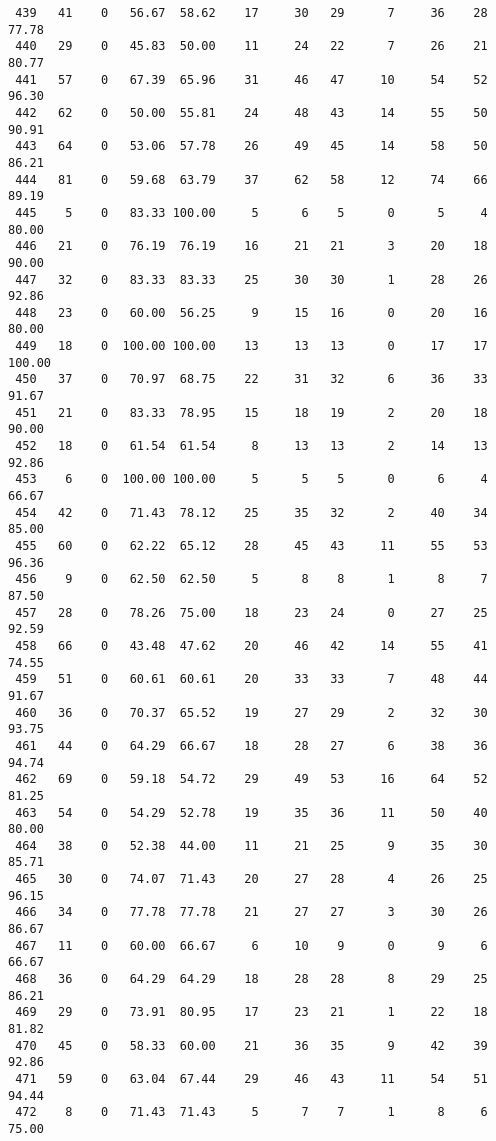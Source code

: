 \begin{verbatim}
 439   41    0   56.67  58.62    17     30   29      7     36    28    77.78
 440   29    0   45.83  50.00    11     24   22      7     26    21    80.77
 441   57    0   67.39  65.96    31     46   47     10     54    52    96.30
 442   62    0   50.00  55.81    24     48   43     14     55    50    90.91
 443   64    0   53.06  57.78    26     49   45     14     58    50    86.21
 444   81    0   59.68  63.79    37     62   58     12     74    66    89.19
 445    5    0   83.33 100.00     5      6    5      0      5     4    80.00
 446   21    0   76.19  76.19    16     21   21      3     20    18    90.00
 447   32    0   83.33  83.33    25     30   30      1     28    26    92.86
 448   23    0   60.00  56.25     9     15   16      0     20    16    80.00
 449   18    0  100.00 100.00    13     13   13      0     17    17   100.00
 450   37    0   70.97  68.75    22     31   32      6     36    33    91.67
 451   21    0   83.33  78.95    15     18   19      2     20    18    90.00
 452   18    0   61.54  61.54     8     13   13      2     14    13    92.86
 453    6    0  100.00 100.00     5      5    5      0      6     4    66.67
 454   42    0   71.43  78.12    25     35   32      2     40    34    85.00
 455   60    0   62.22  65.12    28     45   43     11     55    53    96.36
 456    9    0   62.50  62.50     5      8    8      1      8     7    87.50
 457   28    0   78.26  75.00    18     23   24      0     27    25    92.59
 458   66    0   43.48  47.62    20     46   42     14     55    41    74.55
 459   51    0   60.61  60.61    20     33   33      7     48    44    91.67
 460   36    0   70.37  65.52    19     27   29      2     32    30    93.75
 461   44    0   64.29  66.67    18     28   27      6     38    36    94.74
 462   69    0   59.18  54.72    29     49   53     16     64    52    81.25
 463   54    0   54.29  52.78    19     35   36     11     50    40    80.00
 464   38    0   52.38  44.00    11     21   25      9     35    30    85.71
 465   30    0   74.07  71.43    20     27   28      4     26    25    96.15
 466   34    0   77.78  77.78    21     27   27      3     30    26    86.67
 467   11    0   60.00  66.67     6     10    9      0      9     6    66.67
 468   36    0   64.29  64.29    18     28   28      8     29    25    86.21
 469   29    0   73.91  80.95    17     23   21      1     22    18    81.82
 470   45    0   58.33  60.00    21     36   35      9     42    39    92.86
 471   59    0   63.04  67.44    29     46   43     11     54    51    94.44
 472    8    0   71.43  71.43     5      7    7      1      8     6    75.00

\end{verbatim}

